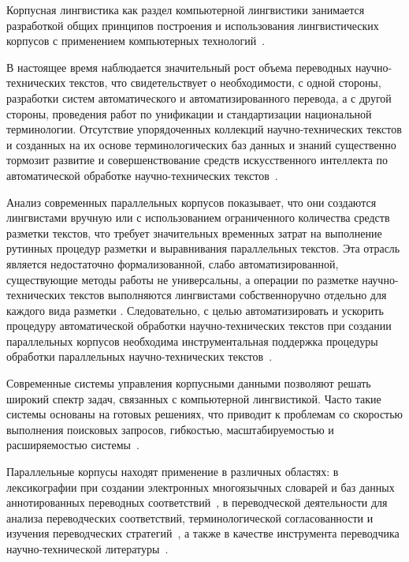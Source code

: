 
Корпусная лингвистика как раздел компьютерной лингвистики занимается разработкой общих принципов построения и использования лингвистических корпусов с применением компьютерных технологий~\cite{butenko2025modeli}.

В настоящее время наблюдается значительный рост объема переводных научно-тех\-ни\-че\-ских текстов, что свидетельствует о необходимости, с одной стороны, разработки систем автоматического и автоматизированного перевода, а с другой стороны, проведения работ по унификации и стандартизации национальной терминологии. Отсутствие упорядоченных коллекций научно-технических текстов и созданных на их основе терминологических баз данных и знаний существенно тормозит развитие и совершенствование средств искусственного интеллекта по автоматической обработке научно-технических текстов~\cite{butenko2025modeli}.

Анализ современных параллельных корпусов показывает, что они создаются лингвистами вручную или с использованием ограниченного количества средств разметки текстов, что требует значительных временных затрат на выполнение рутинных процедур разметки и выравнивания параллельных текстов. Эта отрасль является недостаточно формализованной, слабо автоматизированной, существующие методы работы не универсальны, а операции по разметке научно-технических текстов выполняются лингвистами собственноручно отдельно для каждого вида разметки . Следовательно, с целью автоматизировать и ускорить процедуру автоматической обработки научно-технических текстов при создании параллельных корпусов необходима инструментальная поддержка процедуры обработки параллельных научно-технических текстов~\cite{butenko2025modeli}.

Современные системы управления корпусными данными позволяют решать широкий спектр задач, связанных с компьютерной лингвистикой. Часто такие системы основаны на готовых решениях, что приводит к проблемам со скоростью выполнения поисковых запросов, гибкостью, масштабируемостью и расширяемостью системы~\cite{mukhamedshin_suleymanov_2018}. 

Параллельные корпусы находят применение в различных областях: в лексикографии при создании электронных многоязычных словарей и баз данных аннотированных переводных соответствий~\cite{dobrovolskij_zatsman_2025}, в переводческой деятельности для анализа переводческих соответствий, терминологической согласованности и изучения переводческих стратегий~\cite{fayzieva_2025}, а также в качестве инструмента переводчика научно-технической литературы~\cite{avagyan_2021}.

